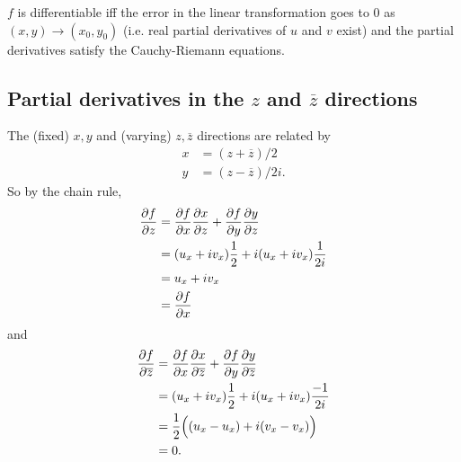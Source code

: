 \documentclass[12pt]{article}
\renewcommand{\bar}{\overline}
\begin{document}


$f$ is differentiable iff the error in the linear transformation goes to $0$ as
$(x,y) \rightarrow (x_0,y_0)$ (i.e. real partial derivatives of $u$ and $v$
exist) and the partial derivatives satisfy the Cauchy-Riemann equations.

\subsection*{Partial derivatives in the $z$ and $\bar z$ directions}
The (fixed) $x, y$ and (varying) $z, \bar z$ directions are related by
\begin{align*}
x &= (z + \bar z)/2 \\
y &= (z - \bar z)/2i.
\end{align*}
So by the chain rule,
\begin{align*}
\frac{\partial f}{\partial z}
&= \frac{\partial f}{\partial x} \frac{\partial x}{\partial z} + \frac{\partial f}{\partial y} \frac{\partial y}{\partial z} \\
&= (u_x + iv_x)\frac{1}{2} + i(u_x + iv_x)\frac{1}{2i} \\
&= u_x + iv_x \\
&= \frac{\partial f}{\partial x}
\end{align*}
and
\begin{align*}
\dfdzbar
&= \dfdx \dxdzbar + \dfdy \dydzbar \\
&= (u_x + iv_x)\frac{1}{2} + i(u_x + iv_x)\frac{-1}{2i} \\
&= \frac{1}{2}\Big((u_x - u_x) + i(v_x - v_x)\Big) \\
&= 0.
\end{align*}
\end{document}
